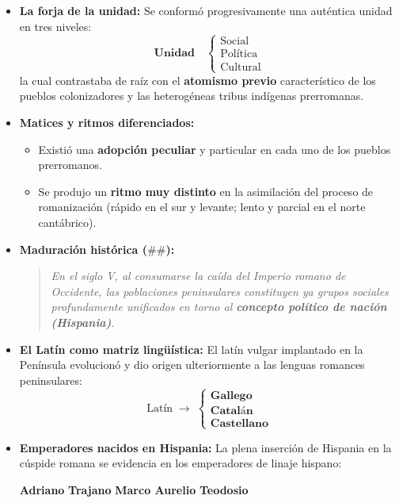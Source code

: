 \documentclass[11pt,letterpaper]{article}
\begin{document}
\begin{conceptbox}[title={Proceso de Romanización: De la Fragmentación a la Unidad}]
  \begin{itemize}
    \item \textbf{La forja de la unidad:} Se conformó progresivamente una auténtica unidad en tres niveles:
    \[
      \textbf{Unidad} \quad\begin{cases}
        \text{Social} \\
        \text{Política} \\
        \text{Cultural}
      \end{cases}
    \]
    la cual contrastaba de raíz con el \textbf{atomismo previo} característico de los pueblos colonizadores y las heterogéneas tribus indígenas prerromanas.
    \item \textbf{Matices y ritmos diferenciados:}
    \begin{itemize}
      \item Existió una \textbf{adopción peculiar} y particular en cada uno de los pueblos prerromanos.
      \item Se produjo un \textbf{ritmo muy distinto} en la asimilación del proceso de romanización (rápido en el sur y levante; lento y parcial en el norte cantábrico).
    \end{itemize}
    \item \textbf{Maduración histórica ($\#\#$):}
    \begin{quote}
      \itshape
      En el siglo V, al consumarse la caída del Imperio romano de Occidente, las poblaciones peninsulares constituyen ya grupos sociales profundamente unificados en torno al \textbf{concepto político de nación (Hispania)}.
    \end{quote}
    \item \textbf{El Latín como matriz lingüística:}
    El latín vulgar implantado en la Península evolucionó y dio origen ulteriormente a las lenguas romances peninsulares:
    \[
      \text{Latín} \;\longrightarrow\; \begin{cases}
        \textbf{Gallego} \\
        \textbf{Catalán} \\
        \textbf{Castellano}
      \end{cases}
    \]
    \item \textbf{Emperadores nacidos en Hispania:} La plena inserción de Hispania en la cúspide romana se evidencia en los emperadores de linaje hispano:
    \begin{center}
      \textbf{Adriano} \quad\textbullet\quad \textbf{Trajano} \quad\textbullet\quad \textbf{Marco Aurelio} \quad\textbullet\quad \textbf{Teodosio}
    \end{center}
  \end{itemize}
\end{conceptbox}
\end{document}
